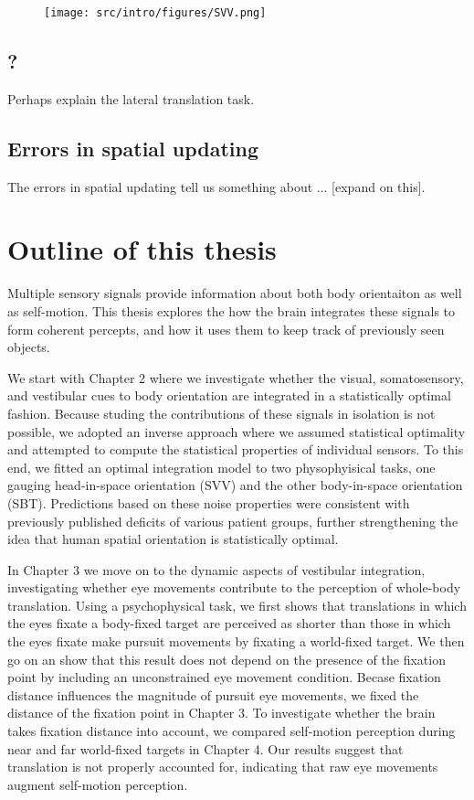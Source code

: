 \begin{figure}
    \texttt{[image: src/intro/figures/SVV.png]}

    \caption{}
    \label{intro:fig5}
\end{figure}


\subsection{?}

Perhaps explain the lateral translation task.

\subsection{Errors in spatial updating}

The errors in spatial updating tell us something about ... [expand on this].


\section{Outline of this thesis}
Multiple sensory signals provide information about both body orientaiton as well as self-motion. This thesis explores the how the brain integrates these signals to form coherent percepts, and how it uses them to keep track of previously seen objects.

We start with Chapter 2 where we investigate whether the visual, somatosensory, and vestibular cues to body orientation are integrated in a statistically optimal fashion. Because studing the contributions of these signals in isolation is not possible, we adopted an inverse approach where we assumed statistical optimality and attempted to compute the statistical properties of individual sensors. To this end, we fitted an optimal integration model to two physophyisical tasks, one gauging head-in-space orientation (SVV) and the other body-in-space orientation (SBT). Predictions based on these noise properties were consistent with previously published deficits of various patient groups, further strengthening the idea that human spatial orientation is statistically optimal.

In Chapter 3 we move on to the dynamic aspects of vestibular integration, investigating whether eye movements contribute to the perception of whole-body translation. Using a psychophysical task, we first shows that translations in which the eyes fixate a body-fixed target are perceived as shorter than those in which the eyes fixate make pursuit movements by fixating a world-fixed target. We then go on an show that this result does not depend on the presence of the fixation point by including an unconstrained eye movement condition. Becase fixation distance influences the magnitude of pursuit eye movements, we fixed the distance of the fixation point in Chapter 3. To investigate whether the brain takes fixation distance into account, we compared self-motion perception during near and far world-fixed targets in Chapter 4. Our results suggest that translation is not properly accounted for, indicating that raw eye movements augment self-motion perception.

